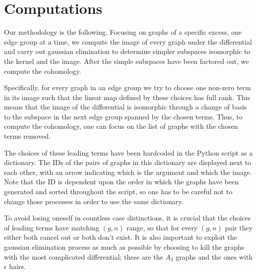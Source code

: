 \section{Computations} \label{sec:Computations}

Our methodology is the following. Focusing on graphs of a specific excess, one edge group at a time, we compute the image of every graph under the differential and carry out gaussian elimination to determine simpler subspaces isomorphic to the kernel and the image.
After the simple subspaces have been factored out, we compute the cohomology.

Specifically, for every graph in an edge group we try to choose one non-zero term in its image such that the linear map defined by these choices has full rank. This means that the image of the differential is isomorphic through a change of basis to the subspace in the next edge group spanned by the chosen terms. Thus, to compute the cohomology, one can focus on the list of graphs with the chosen terms removed.

The choices of these leading terms have been hardcoded in the Python script as a dictionary.
The IDs of the pairs of graphs in this dictionary are displayed next to each other, with an arrow indicating which is the argument and which the image. Note that the ID is dependent upon the order in which the graphs have been generated and sorted throughout the script, so one has to be careful not to change those processes in order to use the same dictionary.

To avoid losing oneself in countless case distinctions, it is crucial that the choices of leading terms have matching $(g,n)$ range, so that for every $(g,n)$ pair they either both cancel out or both don't exist. It is also important to exploit the gaussian elimination process as much as possible by choosing to kill the graphs with the most complicated differential; these are the $A_3$ graphs and the ones with $\epsilon$ hairs.

\newpage

